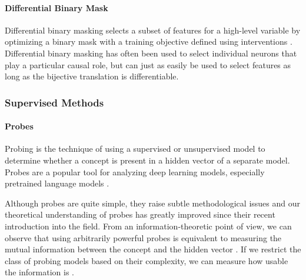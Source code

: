 \documentclass[twoside,11pt]{article}
\begin{document}
\paragraph{Differential Binary Mask}

Differential binary masking selects a subset of features for a high-level variable by optimizing a binary mask with a training objective defined using interventions \citep{Cao2020, Csordas2021, de2021sparse, Davies:2023, prakash2024finetuning, huang2024ravel}. Differential binary masking has often been used to select individual neurons that play a particular causal role, but can just as easily be used to select features as long as the bijective translation is differentiable.



\subsubsection{Supervised Methods }

\paragraph{Probes}
Probing is the technique of using a supervised or unsupervised model to determine whether a concept is present in a hidden vector of a separate model. Probes are a popular tool for analyzing deep learning models, especially pretrained language models \citep{Hupkes:2018,conneau-etal-2018-cram, peters-etal-2018-dissecting,tenney-etal-2019-bert,clark-etal-2019-bert}.

Although probes are quite simple, they raise subtle methodological issues and our theoretical understanding of probes has greatly improved since their recent introduction into the field. From an information-theoretic point of view, we can observe that using arbitrarily powerful probes is equivalent to measuring the mutual information between the concept and the hidden vector \citep{hewitt-liang-2019-designing, Pimentel:2020}. If we restrict the class of probing models based on their complexity, we can measure how usable the information is \citep{Xu:2020, Hewitt:2021}. 
\end{document}
